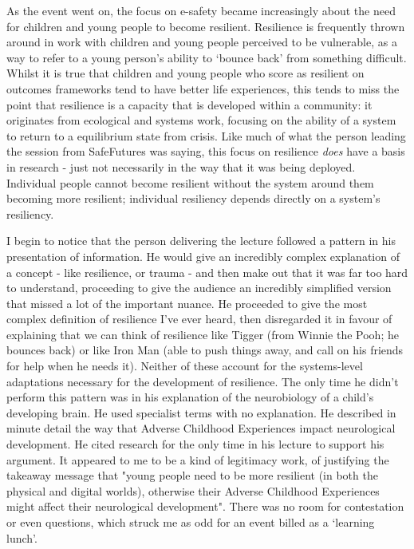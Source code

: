 As the event went on, the focus on e-safety became increasingly about the need for children and young people to become resilient. Resilience is frequently thrown around in work with children and young people perceived to be vulnerable, as a way to refer to a young person's ability to `bounce back' from something difficult. Whilst it is true that children and young people who score as resilient on outcomes frameworks tend to have better life experiences, this tends to miss the point that resilience is a capacity that is developed within a community: it originates from ecological and systems work, focusing on the ability of a system to return to a equilibrium state from crisis. Like much of what the person leading the session from SafeFutures was saying, this focus on resilience \textit{does} have a basis in research - just not necessarily in the way that it was being deployed. Individual people cannot become resilient without the system around them becoming more resilient; individual resiliency depends directly on a system's resiliency. 

I begin to notice that the person delivering the lecture followed a pattern in his presentation of information. He would give an incredibly complex explanation of a concept - like resilience, or trauma - and then make out that it was far too hard to understand, proceeding to give the audience an incredibly simplified version that missed a lot of the important nuance. He proceeded to give the most complex definition of resilience I've ever heard, then disregarded it in favour of explaining that we can think of resilience like Tigger (from Winnie the Pooh; he bounces back) or like Iron Man (able to push things away, and call on his friends for help when he needs it). Neither of these account for the systems-level adaptations necessary for the development of resilience. The only time he didn't perform this pattern was in his explanation of the neurobiology of a child's developing brain. He used specialist terms with no explanation. He described in minute detail the way that Adverse Childhood Experiences impact neurological development. He cited research for the only time in his lecture to support his argument. It appeared to me to be a kind of legitimacy work, of justifying the takeaway message that "young people need to be more resilient (in both the physical and digital worlds), otherwise their Adverse Childhood Experiences might affect their neurological development". There was no room for contestation or even questions, which struck me as odd for an event billed as a `learning lunch'.

